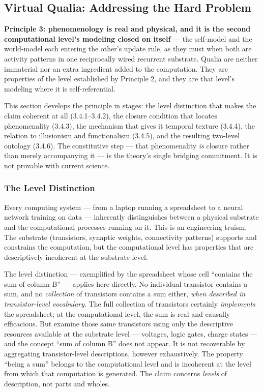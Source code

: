 \documentclass[12pt]{article}
\newcommand{\rev}[1]{#1}
\begin{document}
\subsection{Virtual Qualia: \rev{Addressing} the Hard Problem}

\textbf{Principle 3: phenomenology is real and physical, and it is the second computational level's modeling closed on itself} --- the self-model and the world-model each entering the other's update rule, as they must when both are activity patterns in one reciprocally wired recurrent substrate. Qualia are neither immaterial nor an extra ingredient added to the computation. They are properties of the level established by Principle 2, and they are that level's modeling where it is self-referential.

This section develops the principle in stages: the level distinction that makes the claim coherent at all (3.4.1--3.4.2), the closure condition that locates phenomenality (3.4.3), the mechanism that gives it temporal texture (3.4.4), the relation to illusionism and functionalism (3.4.5), and the resulting two-level ontology (3.4.6). The constitutive step --- that phenomenality \emph{is} closure rather than merely accompanying it --- is the theory's single bridging commitment. It is not provable with current science.



\subsubsection{The Level Distinction}


Every computing system --- from a laptop running a spreadsheet to a neural network training on data --- inherently distinguishes between a physical substrate and the computational processes running on it. This is an engineering truism. The substrate (transistors, synaptic weights, connectivity patterns) supports and constrains the computation, but the computational level has properties that are descriptively incoherent at the substrate level.

The level distinction --- exemplified by the spreadsheet whose cell ``contains the sum of column B'' --- applies here directly. No individual transistor contains a sum, and no \emph{collection} of transistors contains a sum either, \emph{when described in transistor-level vocabulary}. The full collection of transistors certainly \emph{implements} the spreadsheet; at the computational level, the sum is real and causally efficacious. But examine those same transistors using only the descriptive resources available at the substrate level --- voltages, logic gates, charge states --- and the concept ``sum of column B'' does not appear. It is not recoverable by aggregating transistor-level descriptions, however exhaustively. The property ``being a sum'' belongs to the computational level and is incoherent at the level from which that computation is generated. The claim concerns \emph{levels} of description, not parts and wholes.
\end{document}
